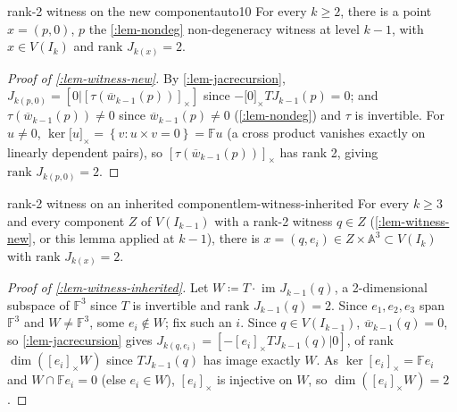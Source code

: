 \documentclass[a4paper,11pt]{scrartcl}
\begin{document}
\begin{lemma}{rank-2 witness on the new component}{auto10} For every \(k \geq 2\), there is a point \(x = (p,0)\), \(p\) the \cref{:lem-nondeg} non-degeneracy witness at level \(k - 1\), with \(x \in V\left( I_{k} \right)\) and \(\text{rank }J_{k(x)} = 2\).

\end{lemma} \protect{}\label{lem-witness-new}{}

\begin{proof}[Proof of \cref{:lem-witness-new}] By \cref{:lem-jacrecursion}, \(J_{k(p,0)} = \left\lbrack 0|\left\lbrack \tau({\overline{w}}_{k - 1}(p)) \right\rbrack_{\times} \right\rbrack\) since \(- \lbrack 0\rbrack_{\times}TJ_{k - 1}(p) = 0\); and \(\tau({\overline{w}}_{k - 1}(p)) \neq 0\) since \({\overline{w}}_{k - 1}(p) \neq 0\) (\cref{:lem-nondeg}) and \(\tau\) is invertible. For \(u \neq 0\), \(\ker\lbrack u\rbrack_{\times} = \left\{ v:u \times v = 0 \right\} = \mathbb{F}u\) (a cross product vanishes exactly on linearly dependent pairs), so \(\left\lbrack \tau({\overline{w}}_{k - 1}(p)) \right\rbrack_{\times}\) has rank 2, giving \(\text{rank }J_{k(p,0)} = 2\).

\end{proof}

\begin{lemma}{rank-2 witness on an inherited component}{lem-witness-inherited} For every \(k \geq 3\) and every component \(Z\) of \(V\left( I_{k - 1} \right)\) with a rank-2 witness \(q \in Z\) (\cref{:lem-witness-new}, or this lemma applied at \(k - 1\)), there is \(x = \left( q,e_{i} \right) \in Z \times \mathbb{A}^{3} \subset V\left( I_{k} \right)\) with \(\text{rank }J_{k(x)} = 2\).

\end{lemma} \protect{}\label{lem-witness-inherited}{}

\begin{proof}[Proof of \cref{:lem-witness-inherited}] Let \(W ≔ T \cdot \text{ im }J_{k - 1}(q)\), a 2-dimensional subspace of \(\mathbb{F}^{3}\) since \(T\) is invertible and \(\text{rank }J_{k - 1}(q) = 2\). Since \(e_{1},e_{2},e_{3}\) span \(\mathbb{F}^{3}\) and \(W \neq \mathbb{F}^{3}\), some \(e_{i} \notin W\); fix such an \(i\). Since \(q \in V\left( I_{k - 1} \right)\), \({\overline{w}}_{k - 1}(q) = 0\), so \cref{:lem-jacrecursion} gives \(J_{k\left( q,e_{i} \right)} = \left\lbrack - \left\lbrack e_{i} \right\rbrack_{\times}TJ_{k - 1}(q)|0 \right\rbrack\), of rank \(\dim(\left\lbrack e_{i} \right\rbrack_{\times}W)\) since \(TJ_{k - 1}(q)\) has image exactly \(W\). As \(\ker\left\lbrack e_{i} \right\rbrack_{\times} = \mathbb{F}e_{i}\) and \(W \cap \mathbb{F}e_{i} = 0\) (else \(e_{i} \in W\)), \(\left\lbrack e_{i} \right\rbrack_{\times}\) is injective on \(W\), so \(\dim(\left\lbrack e_{i} \right\rbrack_{\times}W) = 2\).

\end{proof}
\end{document}
